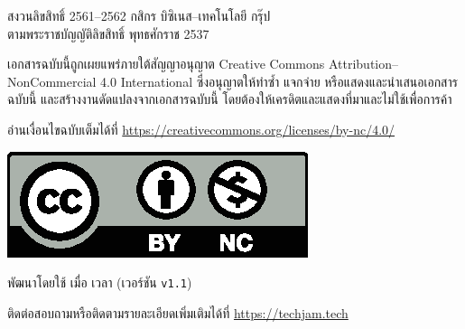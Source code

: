 \begin{small}
    \bigskip\noindent
    {\textcopyright} สงวนลิขสิทธิ์ 2561{\hrsp--\hrsp}2562\; กสิกร บิซิเนส{\hrsp--\hrsp}เทคโนโลยี กรุ๊ป \\
    ตามพระราชบัญญัติลิขสิทธิ์ พุทธศักราช 2537

    \smallskip\noindent
    เอกสารฉบับนี้ถูกเผยแพร่ภายใต้สัญญาอนุญาต Creative Commons Attribution--NonCommercial 4.0 International
    ซึ่งอนุญาตให้ทำซ้ำ แจกจ่าย หรือแสดงและนำเสนอเอกสารฉบับนี้ และสร้างงานดัดแปลงจากเอกสารฉบับนี้\;
    โดยต้องให้เครดิตและแสดงที่มาและไม่ใช้เพื่อการค้า

    \smallskip\noindent
    อ่านเงื่อนไขฉบับเต็มได้ที่\; \url{https://creativecommons.org/licenses/by-nc/4.0/} 

    \bigskip\noindent
    \includegraphics[width=0.190983\linewidth]{assets/by-nc.eps}

    \medskip\noindent
    พัฒนาโดยใช้ {\XeLaTeX} เมื่อ \texttt{\DTMtoday} เวลา \texttt{\DTMcurrenttime} 
    (เวอร์ชัน \texttt{v1.1})

    \smallskip\noindent
    ติดต่อสอบถามหรือติดตามรายละเอียดเพิ่มเติมได้ที่\; \url{https://techjam.tech}
    
\end{small}
